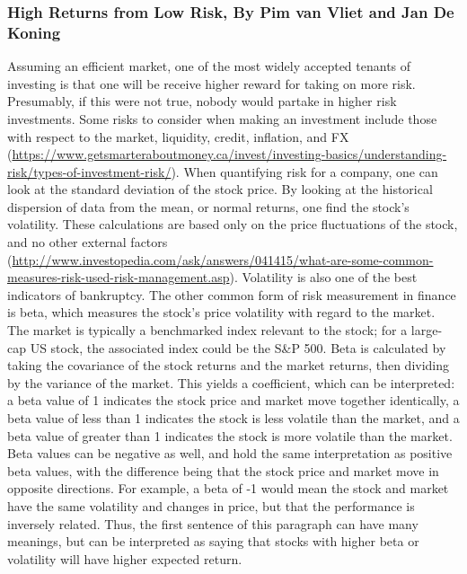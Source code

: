 \documentclass[12pt,twoside]{reedthesis}
\theoremstyle{definition}
\theoremstyle{definition}
\theoremstyle{definition}
\theoremstyle{remark}
\begin{document}
\subsubsection{High Returns from Low Risk, By Pim van Vliet and Jan De
Koning}\label{high-returns-from-low-risk-by-pim-van-vliet-and-jan-de-koning}

Assuming an efficient market, one of the most widely accepted tenants of
investing is that one will be receive higher reward for taking on more
risk. Presumably, if this were not true, nobody would partake in higher
risk investments. Some risks to consider when making an investment
include those with respect to the market, liquidity, credit, inflation,
and FX
(\url{https://www.getsmarteraboutmoney.ca/invest/investing-basics/understanding-risk/types-of-investment-risk/}).
When quantifying risk for a company, one can look at the standard
deviation of the stock price. By looking at the historical dispersion of
data from the mean, or normal returns, one find the stock's volatility.
These calculations are based only on the price fluctuations of the
stock, and no other external factors
(\url{http://www.investopedia.com/ask/answers/041415/what-are-some-common-measures-risk-used-risk-management.asp}).
Volatility is also one of the best indicators of bankruptcy. The other
common form of risk measurement in finance is beta, which measures the
stock's price volatility with regard to the market. The market is
typically a benchmarked index relevant to the stock; for a large-cap US
stock, the associated index could be the S\&P 500. Beta is calculated by
taking the covariance of the stock returns and the market returns, then
dividing by the variance of the market. This yields a coefficient, which
can be interpreted: a beta value of 1 indicates the stock price and
market move together identically, a beta value of less than 1 indicates
the stock is less volatile than the market, and a beta value of greater
than 1 indicates the stock is more volatile than the market. Beta values
can be negative as well, and hold the same interpretation as positive
beta values, with the difference being that the stock price and market
move in opposite directions. For example, a beta of -1 would mean the
stock and market have the same volatility and changes in price, but that
the performance is inversely related. Thus, the first sentence of this
paragraph can have many meanings, but can be interpreted as saying that
stocks with higher beta or volatility will have higher expected return.
\end{document}
